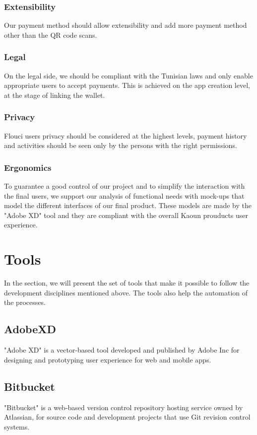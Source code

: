 \begin{spacing}{1.2}
\subsubsection{Extensibility}
Our payment method should allow extensibility and add more payment method other than the QR code scans. 
\subsubsection{Legal}
On the legal side, we should be compliant with the Tunisian laws and only enable appropriate users to accept payments.
This is achieved on the app creation level, at the stage of linking the wallet.
\subsubsection{Privacy}
Flouci users privacy should be considered at the highest levels, payment history and activities should be seen only by the persons with the right permissions.
\subsubsection{Ergonomics}
To guarantee a good control of our project and to simplify the interaction with the final users, we support our analysis of functional needs with mock-ups that model the different interfaces of our final product. These models are made by the "Adobe XD" tool and they are compliant with the overall Kaoun prouducts user experience. 

\section{Tools}
In the section, we will present the set of tools that make it possible to follow the development disciplines mentioned above. The tools also help the automation of the processes.
\subsection{AdobeXD}
"Adobe XD"\cite{AdobeXD} is a vector-based tool developed and published by Adobe Inc for designing and prototyping user experience for web and mobile apps.
\subsection{Bitbucket}
"Bitbucket"\cite{Bitbucket} is a web-based version control repository hosting service owned by Atlassian, for source code and development projects that use Git revision control systems.

\end{spacing}
